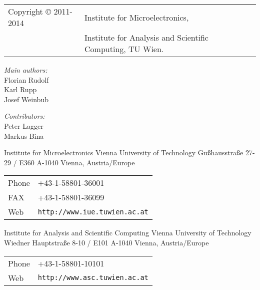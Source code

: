 
\clearpage

\begin{tabular}{ll}
Copyright {\copyright} 2011-2014 & Institute for Microelectronics, \\
                            & Institute for Analysis and Scientific Computing, TU Wien.
\end{tabular}

\vspace{2.5cm}

\textit{Main authors:}\\

Florian Rudolf \\
Karl Rupp\\
Josef Weinbub \\

\vspace{1cm}

\textit{Contributors:}\\

Peter Lagger \\
Markus Bina


\vspace{3.0cm}

Institute for Microelectronics\newline
Vienna University of Technology\newline
Gu\ss hausstra\ss e 27-29 / E360\newline
A-1040 Vienna, Austria/Europe\newline

\begin{tabular}{ll}
Phone  & +43-1-58801-36001\\
FAX    & +43-1-58801-36099\\
Web    & \texttt{http://www.iue.tuwien.ac.at}
\end{tabular}

\vspace{1.5cm}

Institute for Analysis and Scientific Computing\newline
Vienna University of Technology\newline
Wiedner Hauptstra\ss e 8-10 / E101\newline
A-1040 Vienna, Austria/Europe\newline

\begin{tabular}{ll}
Phone  & +43-1-58801-10101\\
Web    & \texttt{http://www.asc.tuwien.ac.at}
\end{tabular}





